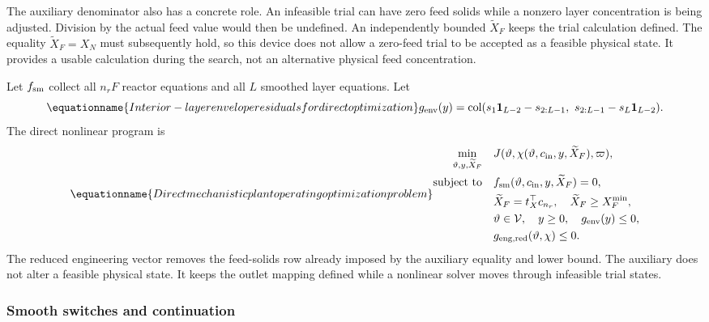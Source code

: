 The auxiliary denominator also has a concrete role. An infeasible trial can have zero feed solids while a nonzero layer concentration is being adjusted. Division by the actual feed value would then be undefined. An independently bounded $\widetilde X_F$ keeps the trial calculation defined. The equality $\widetilde X_F=X_N$ must subsequently hold, so this device does not allow a zero-feed trial to be accepted as a feasible physical state. It provides a usable calculation during the search, not an alternative physical feed concentration.

Let $f_{\rm sm}$ collect all $n_rF$ reactor equations and all $L$ smoothed layer equations. Let
\begin{equation}
\equationname{Interior-layer envelope residuals for direct optimization}
g_{\rm env}(y)=\operatorname{col}
(s_1\mathbf1_{L-2}-s_{2:L-1},\ s_{2:L-1}-s_L\mathbf1_{L-2}).
\end{equation}
The direct nonlinear program is
\begin{equation}
\equationname{Direct mechanistic plant operating optimization problem}
\begin{aligned}
\min_{\vartheta,y,\widetilde X_F}\quad&J(\vartheta,\chi(\vartheta,c_{\rm in},y,\widetilde X_F),\varpi),\\
\text{subject to}\quad&f_{\rm sm}(\vartheta,c_{\rm in},y,\widetilde X_F)=0,\\
&\widetilde X_F=t_X^\top c_{n_r},\quad\widetilde X_F\ge X_F^{\min},\\
&\vartheta\in\mathcal V,\quad y\ge0,\quad g_{\rm env}(y)\le0,\\
&g_{{\rm eng},\rm red}(\vartheta,\chi)\le0.
\end{aligned}
\label{eq:plant_direct_optimization}
\end{equation}
The reduced engineering vector removes the feed-solids row already imposed by the auxiliary equality and lower bound. The auxiliary does not alter a feasible physical state. It keeps the outlet mapping defined while a nonlinear solver moves through infeasible trial states.

\subsubsection{Smooth switches and continuation}

